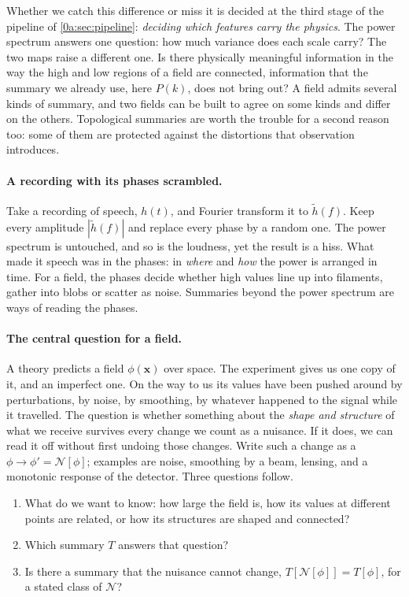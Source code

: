 Whether we catch this difference or miss it is decided at the third stage of
the pipeline of \cref{0a:sec:pipeline}: \emph{deciding which features carry
the physics}. The power spectrum answers one question: how much variance does
each scale carry? The two maps raise a different one. Is there physically
meaningful information in the way the high and low regions of a field are
connected, information that the summary we already use, here $P(k)$, does not
bring out? A field admits several kinds of summary, and two fields can be
built to agree on some kinds and differ on the others. Topological summaries
are worth the trouble for a second reason too: some of them are protected
against the distortions that observation introduces.

\paragraph{A recording with its phases scrambled.}
Take a recording of speech, $h(t)$, and Fourier transform it to $\tilde h(f)$.
Keep every amplitude $|\tilde h(f)|$ and replace every phase by a random one.
The power spectrum is untouched, and so is the loudness, yet the result is a
hiss. What made it speech was in the phases: in \emph{where} and \emph{how}
the power is arranged in time. For a field, the phases decide whether high
values line up into filaments, gather into blobs or scatter as noise.
Summaries beyond the power spectrum are ways of reading the phases.

\paragraph{The central question for a field.}
A theory predicts a field $\phi(\mathbf x)$ over space. The experiment gives
us one copy of it, and an imperfect one. On the way to us its values have been
pushed around by perturbations, by noise, by smoothing, by whatever happened
to the signal while it travelled. The question is whether something about the
\emph{shape and structure} of what we receive survives every change we count
as a nuisance. If it does, we can read it off without first undoing those
changes. Write such a change as a 
$\phi\to\phi'=\mathcal N[\phi]$; examples are noise, smoothing by a beam,
lensing, and a monotonic response of the detector. Three questions follow.
\begin{enumerate}[leftmargin=2em]
  \item What do we want to know: how large the field is, how its values at different points are related, or how its structures are shaped and connected?
  \item Which summary $T$ answers that question?
  \item Is there a summary that the nuisance cannot change, $T[\mathcal N[\phi]]=T[\phi]$, for a stated class of $\mathcal N$?
\end{enumerate}

